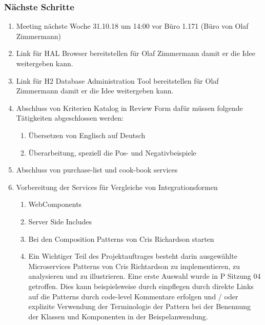 \documentclass{article}
\begin{document}
\subsubsection{Nächste Schritte}
\begin{enumerate}
    \item Meeting nächste Woche 31.10.18 um 14:00 vor Büro 1.171 (Büro von Olaf Zimmermann) \checkmark
    \item Link für HAL Browser bereitstellen für Olaf Zimmermann damit er die Idee weitergeben kann. \checkmark
    \item Link für H2 Database Administration Tool bereitstellen für Olaf Zimmermann damit er die Idee weitergeben kann. \checkmark
    \item Abschluss von Kriterien Katalog in Review Form dafür müssen folgende Tätigkeiten abgeschlossen werden:
    \begin{enumerate}
        \item Übersetzen von Englisch auf Deutsch
        \item Überarbeitung, speziell die Pos- und Negativbeispiele
    \end{enumerate}
    \item Abschluss von purchase-list und cook-book services
    \item Vorbereitung der Services für Vergleiche von Integrationsformen
        \begin{enumerate}
            \item WebComponents
            \item Server Side Includes
            \item Bei den Composition Patterns von Cris Richardson starten
            \item Ein Wichtiger Teil des Projektauftrages besteht darin ausgewählte Microservices Patterns von Cris Richtardson zu implementieren, zu analysieren und zu illustrieren. Eine erste Auswahl wurde in P Sitzung 04 getroffen. Dies kann beispielsweise durch einpflegen durch direkte Links auf die Patterns durch code-level Kommentare erfolgen und / oder explizite Verwendung der Terminologie der Pattern bei der Benennung der Klassen und Komponenten in der Beispelanwendung.
        \end{enumerate}
\end{enumerate}
\end{document}

